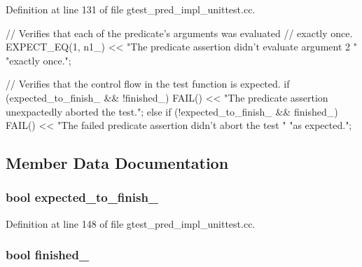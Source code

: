 \-Definition at line 131 of file gtest\-\_\-pred\-\_\-impl\-\_\-unittest.\-cc.


\begin{DoxyCode}
                          {
    // Verifies that each of the predicate's arguments was evaluated
    // exactly once.
    EXPECT_EQ(1, n1_) <<
        "The predicate assertion didn't evaluate argument 2 "
        "exactly once.";

    // Verifies that the control flow in the test function is expected.
    if (expected_to_finish_ && !finished_) {
      FAIL() << "The predicate assertion unexpactedly aborted the test.";
    } else if (!expected_to_finish_ && finished_) {
      FAIL() << "The failed predicate assertion didn't abort the test "
                "as expected.";
    }
  }
\end{DoxyCode}


\subsection{\-Member \-Data \-Documentation}
\hypertarget{classPredicate1Test_af30fae6aaebdd5a6cb055c420573754d}{
\subsubsection[{expected\-\_\-to\-\_\-finish\-\_\-}]{\setlength{\rightskip}{0pt plus 5cm}bool {\bf expected\-\_\-to\-\_\-finish\-\_\-}}}\label{da/d9a/classPredicate1Test_af30fae6aaebdd5a6cb055c420573754d}


\-Definition at line 148 of file gtest\-\_\-pred\-\_\-impl\-\_\-unittest.\-cc.

\hypertarget{classPredicate1Test_a9189d6cfedf2ace6f5f6aa152ba38f83}{
\subsubsection[{finished\-\_\-}]{\setlength{\rightskip}{0pt plus 5cm}bool {\bf finished\-\_\-}}}\label{da/d9a/classPredicate1Test_a9189d6cfedf2ace6f5f6aa152ba38f83}


